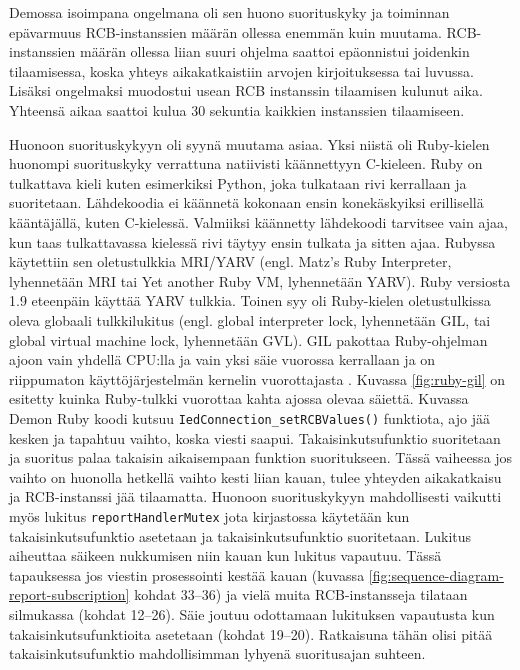 Demossa isoimpana ongelmana oli sen huono suorituskyky ja toiminnan epävarmuus RCB-instanssien määrän ollessa enemmän kuin muutama. RCB-instanssien määrän ollessa liian suuri ohjelma saattoi epäonnistui joidenkin tilaamisessa, koska yhteys aikakatkaistiin arvojen kirjoituksessa tai luvussa. Lisäksi ongelmaksi muodostui usean RCB instanssin tilaamisen kulunut aika. Yhteensä aikaa saattoi kulua 30 sekuntia kaikkien instanssien tilaamiseen.

Huonoon suorituskykyyn oli syynä muutama asiaa. Yksi niistä oli Ruby-kielen huonompi suorituskyky verrattuna natiivisti käännettyyn C-kieleen. Ruby on tulkattava kieli kuten esimerkiksi Python, joka tulkataan rivi kerrallaan ja suoritetaan. Lähdekoodia ei käännetä kokonaan ensin konekäskyiksi erillisellä kääntäjällä, kuten C-kielessä. Valmiiksi käännetty lähdekoodi tarvitsee vain ajaa, kun taas tulkattavassa kielessä rivi täytyy ensin tulkata ja sitten ajaa. Rubyssa käytettiin sen oletustulkkia MRI/YARV (engl. Matz's Ruby Interpreter, lyhennetään MRI tai Yet another Ruby VM, lyhennetään YARV). Ruby versiosta 1.9 eteenpäin käyttää YARV tulkkia. Toinen syy oli Ruby-kielen oletustulkissa oleva globaali tulkkilukitus (engl. global interpreter lock, lyhennetään GIL, tai global virtual machine lock, lyhennetään GVL). GIL pakottaa Ruby-ohjelman ajoon vain yhdellä CPU:lla ja vain yksi säie vuorossa kerrallaan ja on riippumaton käyttöjärjestelmän kernelin vuorottajasta \cite[s.~131--133]{Odaira2014}. Kuvassa \ref{fig:ruby-gil} on esitetty kuinka Ruby-tulkki vuorottaa kahta ajossa olevaa säiettä. Kuvassa Demon Ruby koodi kutsuu \texttt{IedConnection\_setRCBValues()} funktiota, ajo jää kesken ja tapahtuu vaihto, koska viesti saapui. Takaisinkutsufunktio suoritetaan ja suoritus palaa takaisin aikaisempaan funktion suoritukseen. Tässä vaiheessa jos vaihto on huonolla hetkellä vaihto kesti liian kauan, tulee yhteyden aikakatkaisu ja RCB-instanssi jää tilaamatta. Huonoon suorituskykyyn mahdollisesti vaikutti myös lukitus \texttt{reportHandlerMutex} jota kirjastossa käytetään kun takaisinkutsufunktio asetetaan ja takaisinkutsufunktio suoritetaan. Lukitus aiheuttaa säikeen nukkumisen niin kauan kun lukitus vapautuu. Tässä tapauksessa jos viestin prosessointi kestää kauan (kuvassa \ref{fig:sequence-diagram-report-subscription} kohdat 33--36) ja vielä muita RCB-instansseja tilataan silmukassa (kohdat 12--26). Säie joutuu odottamaan lukituksen vapautusta kun takaisinkutsufunktioita asetetaan (kohdat 19--20). Ratkaisuna tähän olisi pitää takaisinkutsufunktio mahdollisimman lyhyenä suoritusajan suhteen.

